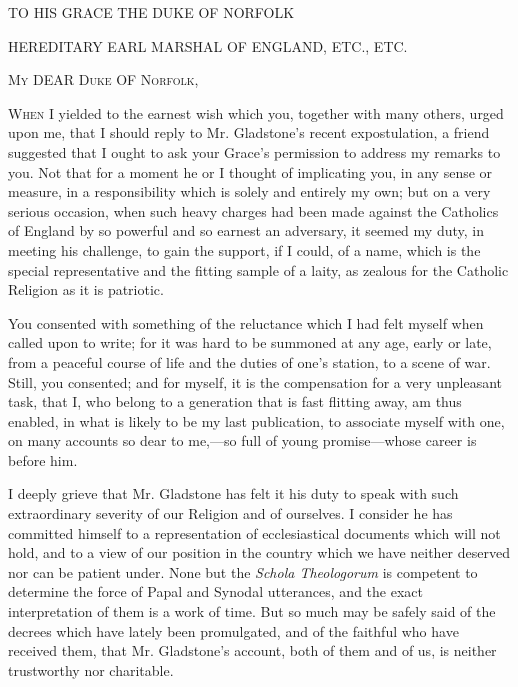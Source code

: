 





TO HIS GRACE THE DUKE OF NORFOLK

HEREDITARY EARL MARSHAL OF ENGLAND, ETC., ETC.


M\textsc{y} DEAR D\textsc{uke}
OF N\textsc{orfolk},

W\textsc{hen} I yielded to the earnest wish which you, together with many
others, urged upon me, that I should reply to Mr. Gladstone's recent
expostulation, a friend suggested that I ought to ask your Grace's
permission to address my remarks to you. Not that for a moment he or I
thought of implicating you, in any sense or measure, in a
responsibility which is solely and entirely my own; but on a very
serious occasion, when such heavy charges had been made against the
Catholics of England by so powerful and so earnest an adversary, it
seemed my duty, in meeting his challenge, to gain the support, if I
could, of a name, which is the special representative and the fitting
sample of a laity, as zealous for the Catholic Religion as it is
patriotic.


You consented with something of the reluctance which I had felt
myself when called upon to write; for it was hard to be summoned
at any age, early or late, from a peaceful course of life and the
duties of one's station, to a scene of war. Still, you consented; and
for myself, it is the compensation for a very unpleasant task, that I,
who belong to a generation that is fast flitting away, am thus
enabled, in what is likely to be my last publication, to associate
myself with one, on many accounts so dear to me,—so full of young
promise—whose career is before him.


I deeply grieve that Mr. Gladstone has felt it his duty to speak
with such extraordinary severity of our Religion and of ourselves. I
consider he has committed himself to a representation of
ecclesiastical documents which will not hold, and to a view of our
position in the country which we have neither deserved nor can be
patient under. None but the \emph{Schola Theologorum} is competent to
determine the force of Papal and Synodal utterances, and the exact
interpretation of them is a work of time. But so much may be safely
said of the decrees which have lately been promulgated, and of the
faithful who have received them, that Mr. Gladstone's account, both of
them and of us, is neither trustworthy nor charitable.


